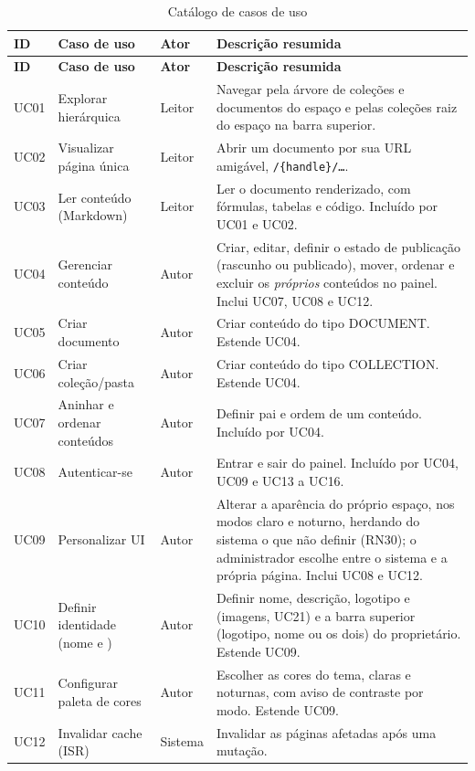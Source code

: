 \begin{longtable}{@{}L{1.2cm}L{4.4cm}L{2.5cm}L{5.0cm}@{}}
\caption{Catálogo de casos de uso}\label{tab:catalogo-uc}\\
\toprule
\textbf{ID} & \textbf{Caso de uso} & \textbf{Ator} & \textbf{Descrição resumida}\\
\midrule
\endfirsthead
\toprule
\textbf{ID} & \textbf{Caso de uso} & \textbf{Ator} & \textbf{Descrição resumida}\\
\midrule
\endhead
\bottomrule
\endfoot
UC01 & Explorar  hierárquica & Leitor & Navegar pela árvore de coleções e documentos do espaço e pelas coleções raiz do espaço na barra superior.\\
UC02 & Visualizar página única & Leitor & Abrir um documento por sua URL amigável, \texttt{/\{handle\}/\ldots}.\\
UC03 & Ler conteúdo (Markdown) & Leitor & Ler o documento renderizado, com fórmulas, tabelas e código. Incluído por UC01 e UC02.\\
UC04 & Gerenciar conteúdo & Autor & Criar, editar, definir o estado de publicação (rascunho ou publicado), mover, ordenar e excluir os \emph{próprios} conteúdos no painel. Inclui UC07, UC08 e UC12.\\
UC05 & Criar documento & Autor & Criar conteúdo do tipo DOCUMENT. Estende UC04.\\
UC06 & Criar coleção/pasta & Autor & Criar conteúdo do tipo COLLECTION. Estende UC04.\\
UC07 & Aninhar e ordenar conteúdos & Autor & Definir pai e ordem de um conteúdo. Incluído por UC04.\\
UC08 & Autenticar-se & Autor & Entrar e sair do painel. Incluído por UC04, UC09 e UC13 a UC16.\\
UC09 & Personalizar UI & Autor & Alterar a aparência do próprio espaço, nos modos claro e noturno, herdando do sistema o que não definir (RN30); o administrador escolhe entre o sistema e a própria página. Inclui UC08 e UC12.\\
UC10 & Definir identidade (nome e ) & Autor & Definir nome, descrição, logotipo e  (imagens, UC21) e a barra superior (logotipo, nome ou os dois) do proprietário. Estende UC09.\\
UC11 & Configurar paleta de cores & Autor & Escolher as cores do tema, claras e noturnas, com aviso de contraste por modo. Estende UC09.\\
UC12 & Invalidar cache (ISR) & Sistema & Invalidar as páginas afetadas após uma mutação.\\

\end{longtable}
